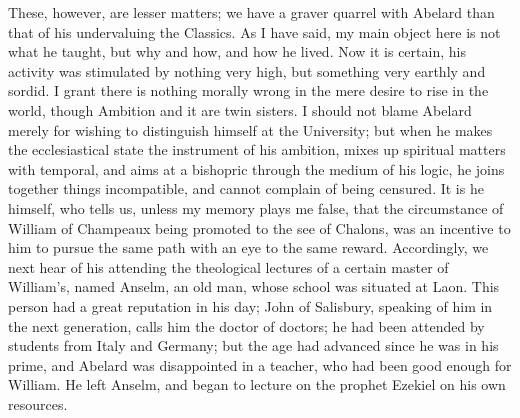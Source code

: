 These, however, are lesser
matters; we have a graver quarrel with Abelard than that of his
undervaluing the Classics. As I have said, my main object here is not
what he taught, but why and how, and how he lived. Now it is certain,
his activity was stimulated by nothing very high, but something very
earthly and sordid. I grant there is nothing morally wrong in the mere
desire to rise in the world, though Ambition and it are twin sisters.
I should not blame Abelard merely for wishing to distinguish himself
at the University; but when he makes the ecclesiastical state the
instrument of his ambition, mixes up spiritual matters with temporal,
and aims at a bishopric through the medium of his logic, he joins
together things incompatible, and cannot complain of being censured.
It is he himself, who tells us, unless my memory plays me false, that
the circumstance of William of Champeaux being promoted to the see of
Chalons, was an incentive to him to pursue the same path with an eye
to the same reward. Accordingly, we next hear of his attending
the theological lectures of a certain master of William's, named
Anselm, an old man, whose school was situated at Laon. This person had
a great reputation in his day; John of Salisbury, speaking of him in
the next generation, calls him the doctor of doctors; he had been
attended by students from Italy and Germany; but the age had advanced
since he was in his prime, and Abelard was disappointed in a teacher,
who had been good enough for William. He left Anselm, and began to
lecture on the prophet Ezekiel on his own resources.

